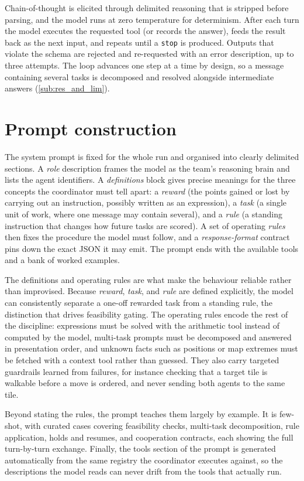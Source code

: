 Chain-of-thought is elicited through delimited reasoning that is stripped before
parsing, and the model runs at zero temperature for determinism. After each turn the
model executes the requested tool (or records the answer), feeds the result
back as the next input, and repeats until a \texttt{stop} is produced. Outputs that
violate the schema are rejected and re-requested with an error description, up to three attempts. 
The loop advances one step at a time by design, so a message containing
several tasks is decomposed and resolved alongside intermediate
answers (\cref{sub:res_and_lim}).


\section{Prompt construction}
\label{sec:prompt}
The system prompt is fixed for the whole run and organised into clearly delimited
sections. A \emph{role} description frames the model as the team's reasoning brain
and lists the agent identifiers. A \emph{definitions} block gives precise meanings
for the three concepts the coordinator must tell apart: a \emph{reward} (the points
gained or lost by carrying out an instruction, possibly written as an expression), a
\emph{task} (a single unit of work, where one message may contain several), and a
\emph{rule} (a standing instruction that changes how future tasks are scored). A set
of operating \emph{rules} then fixes the procedure the model must follow, and a
\emph{response-format} contract pins down the exact JSON it may emit. The prompt ends
with the available tools and a bank of worked examples.

The definitions and operating rules are what make the behaviour reliable rather than
improvised. Because \emph{reward}, \emph{task}, and \emph{rule} are defined
explicitly, the model can consistently separate a one-off rewarded task from a
standing rule, the distinction that drives feasibility gating. The operating rules
encode the rest of the discipline: expressions must be solved with the arithmetic
tool instead of computed by the model, multi-task prompts must be decomposed and
answered in presentation order, and unknown facts such as positions or map extremes
must be fetched with a context tool rather than guessed. They also carry targeted
guardrails learned from failures, for instance checking that a target tile is
walkable before a move is ordered, and never sending both agents to the same tile.

Beyond stating the rules, the prompt teaches them largely by example. It is
few-shot, with curated cases covering feasibility checks, multi-task decomposition,
rule application, holds and resumes, and cooperation contracts, each showing the full
turn-by-turn exchange. Finally, the tools section of the prompt
is generated automatically from the same registry the coordinator executes against,
so the descriptions the model reads can never drift from the tools that actually run.


